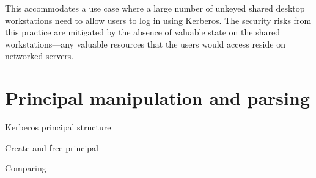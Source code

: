 \documentclass[letterpaper,10pt,english]{sphinxmanual}
\begin{document}
This accommodates a use case where a large number of unkeyed shared
desktop workstations need to allow users to log in using Kerberos.
The security risks from this practice are mitigated by the absence of
valuable state on the shared workstations---any valuable resources
that the users would access reside on networked servers.


\chapter{Principal manipulation and parsing}
\label{appdev/princ_handle:principal-manipulation-and-parsing}\label{appdev/princ_handle::doc}
Kerberos principal structure

{\hyperref[appdev/refs/types/krb5_principal_data:c.krb5_principal_data]{}}

{\hyperref[appdev/refs/types/krb5_principal:c.krb5_principal]{}}

Create and free principal

{\hyperref[appdev/refs/api/krb5_build_principal:c.krb5_build_principal]{}}

{\hyperref[appdev/refs/api/krb5_build_principal_alloc_va:c.krb5_build_principal_alloc_va]{}}

{\hyperref[appdev/refs/api/krb5_build_principal_ext:c.krb5_build_principal_ext]{}}

{\hyperref[appdev/refs/api/krb5_copy_principal:c.krb5_copy_principal]{}}

{\hyperref[appdev/refs/api/krb5_free_principal:c.krb5_free_principal]{}}

{\hyperref[appdev/refs/api/krb5_cc_get_principal:c.krb5_cc_get_principal]{}}

Comparing

{\hyperref[appdev/refs/api/krb5_principal_compare:c.krb5_principal_compare]{}}

{\hyperref[appdev/refs/api/krb5_principal_compare_flags:c.krb5_principal_compare_flags]{}}

{\hyperref[appdev/refs/api/krb5_principal_compare_any_realm:c.krb5_principal_compare_any_realm]{}}

{\hyperref[appdev/refs/api/krb5_sname_match:c.krb5_sname_match]{}}
\end{document}
